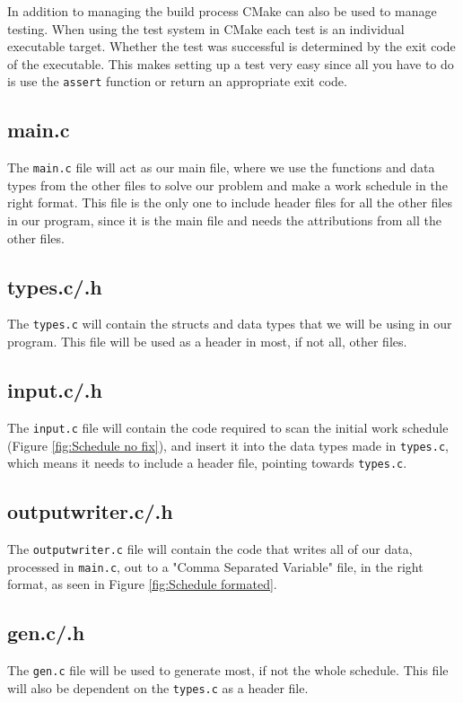 In addition to managing the build process CMake can also be used to manage testing. When using the test system in CMake each test is an individual executable target. Whether the test was successful is determined by the exit code of the executable. This makes setting up a test very easy since all you have to do is use the \verb|assert| function or return an appropriate exit code.


\subsection{main.c}
The \verb|main.c| file will act as our main file, where we use the functions and data types from the other files to solve our problem and make a work schedule in the right format. This file is the only one to include header files for all the other files in our program, since it is the main file and needs the attributions from all the other files.

\subsection{types.c/.h}
The \verb|types.c| will contain the structs and data types that we will be using in our program. This file will be used as a header in most, if not all, other files.

\subsection{input.c/.h}
The \verb|input.c| file will contain the code required to scan the initial work schedule (Figure \ref{fig:Schedule no fix}), and insert it into the data types made in \verb|types.c|, which means it needs to include a header file, pointing towards \verb|types.c|.

\subsection{outputwriter.c/.h}
The \verb|outputwriter.c| file will contain the code that writes all of our data, processed in \verb|main.c|, out to a "Comma Separated Variable" file, in the right format, as seen in Figure \ref{fig:Schedule formated}.

\subsection{gen.c/.h}
The \verb|gen.c| file will be used to generate most, if not the whole schedule. This file will also be dependent on the \verb|types.c| as a header file.


